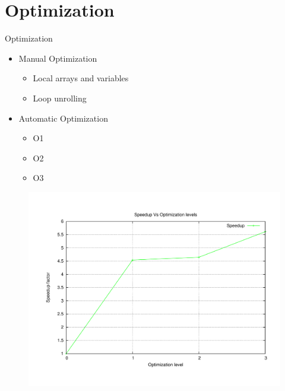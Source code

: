 \documentclass[t,english]{beamer}
\begin{document}
\section{Optimization}
\begin{frame}{Optimization}
\begin{multicols}{2}
\begin{itemize}
\item Manual Optimization
	\begin{itemize}
	\item Local arrays and variables
	\item Loop unrolling
	\end{itemize}
\item Automatic Optimization
	\begin{itemize}
	\item O1
	\item O2
	\item O3
	\end{itemize}
\end{itemize}

\columnbreak
\begin{figure}[ht!]
\centering
\includegraphics[trim=100 0 0 200,scale=0.22]{./Performance.pdf}
\end{figure}
\end{multicols}
\end{frame}
\end{document}
